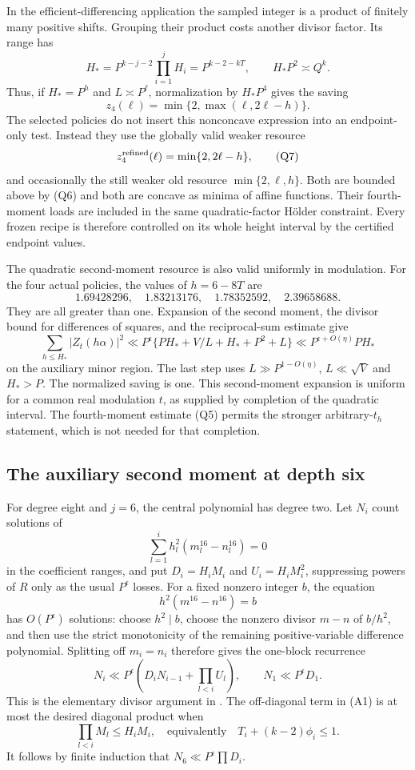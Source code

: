 \documentclass[11pt,letterpaper]{article}
\numberwithin{equation}{section}
\begin{document}
In the efficient-differencing application the sampled integer is a product
of finitely many positive shifts. Grouping their product costs another
divisor factor. Its range has
\[
 H_*=P^{k-j-2}\prod_{i=1}^jH_i=P^{k-2-kT},
 \qquad H_*P^2\asymp Q^k.
\]
Thus, if $H_*=P^h$ and $L\asymp P^\ell$, normalization by $H_*P^4$
gives the saving
\[
 z_4(\ell)=\min\{2,\max(\ell,2\ell-h)\}.            \tag{Q6}
\]
The selected policies do not insert this nonconcave expression into an
endpoint-only test. Instead they use the globally valid weaker resource
\[
 z_4^{\rm refined}(\ell)=\min\{2,2\ell-h\},           \tag{Q7}
\]
and occasionally the still weaker old resource
$\min\{2,\ell,h\}$. Both are bounded above by (Q6) and both are concave
as minima of affine functions. Their fourth-moment loads are included in the
same quadratic-factor H\"older constraint. Every frozen recipe is therefore
controlled on its whole height interval by the certified endpoint values.

The quadratic second-moment resource is also valid uniformly in modulation.
For the four actual policies, the values of $h=6-8T$ are
\[
 1.69428296,\quad1.83213176,\quad1.78352592,\quad2.39658688.
\]
They are all greater than one. Expansion of the second moment, the divisor
bound for differences of squares, and the reciprocal-sum estimate give
\[
 \sum_{h\le H_*}|Z_t(h\alpha)|^2
 \ll P^\epsilon\{PH_*+V/L+H_*+P^2+L\}
 \ll P^{\epsilon+O(\eta)}PH_*
\]
on the auxiliary minor region. The last step uses $L\gg P^{1-O(\eta)}$,
$L\ll\sqrt V$ and $H_*>P$. The normalized saving is one.
This second-moment expansion is uniform for a common real modulation $t$,
as supplied by completion of the quadratic interval. The fourth-moment
estimate (Q5) permits the stronger arbitrary-$t_h$ statement, which is not
needed for that completion.

\subsection{The auxiliary second moment at depth six}

For degree eight and $j=6$, the central polynomial has degree two.
Let $N_i$ count solutions of
\[
 \sum_{l=1}^i h_l^2(m_l^{16}-n_l^{16})=0
\]
in the coefficient ranges, and put
$D_i=H_iM_i$ and $U_i=H_iM_i^2$, suppressing powers of $R$ only as
the usual $P^\epsilon$ losses. For a fixed nonzero integer $b$, the equation
\[
 h^2(m^{16}-n^{16})=b
\]
has $O(P^\epsilon)$ solutions: choose $h^2\mid b$, choose the nonzero
divisor $m-n$ of $b/h^2$, and then use the strict monotonicity of the
remaining positive-variable difference polynomial. Splitting off $m_i=n_i$
therefore gives the one-block recurrence
\[
 N_i\ll P^\epsilon
       \left(D_iN_{i-1}+\prod_{l<i}U_l\right),\qquad
 N_1\ll P^\epsilon D_1.                                  \tag{A1}
\]
This is the elementary divisor argument in \cite[Lemma~3.8]{VW95}.
The off-diagonal term in (A1) is at most the desired diagonal product when
\[
 \prod_{l<i}M_l\le H_iM_i,
 \quad\text{equivalently}\quad T_i+(k-2)\phi_i\le1.       \tag{A2}
\]
It follows by finite induction that $N_6\ll P^\epsilon\prod D_i$.
\end{document}
